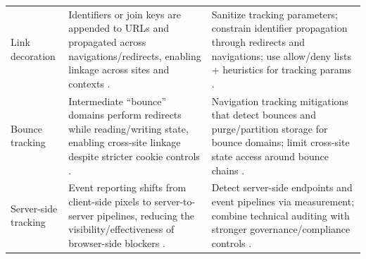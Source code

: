 \begin{table}[t]
\begin{tabularx}{\textwidth}{p{2.8cm} Y Y}
Link decoration &
Identifiers or join keys are appended to URLs and propagated across navigations/redirects, enabling linkage across sites and contexts \cite{munirPURLSafeEffective2024,bekosHitchhikersGuideFacebook2023}. &
Sanitize tracking parameters; constrain identifier propagation through redirects and navigations; use allow/deny lists + heuristics for tracking params \cite{munirPURLSafeEffective2024}. \\

Bounce tracking &
Intermediate “bounce” domains perform redirects while reading/writing state, enabling cross-site linkage despite stricter cookie controls \cite{braveprivacyteamUnlinkableBouncingMore2022,kellyBounceTrackingMitigations2022}. &
Navigation tracking mitigations that detect bounces and purge/partition storage for bounce domains; limit cross-site state access around bounce chains \cite{braveprivacyteamUnlinkableBouncingMore2022,kellyBounceTrackingMitigations2022}. \\

Server-side tracking &
Event reporting shifts from client-side pixels to server-to-server pipelines, reducing the visibility/effectiveness of browser-side blockers \cite{fouadDevilDetailsDetection2024,fraihiClientsideServersideTracking2024}. &
Detect server-side endpoints and event pipelines via measurement; combine technical auditing with stronger governance/compliance controls \cite{fouadDevilDetailsDetection2024,fraihiClientsideServersideTracking2024}. \\

\bottomrule
\end{tabularx}
\end{table}
